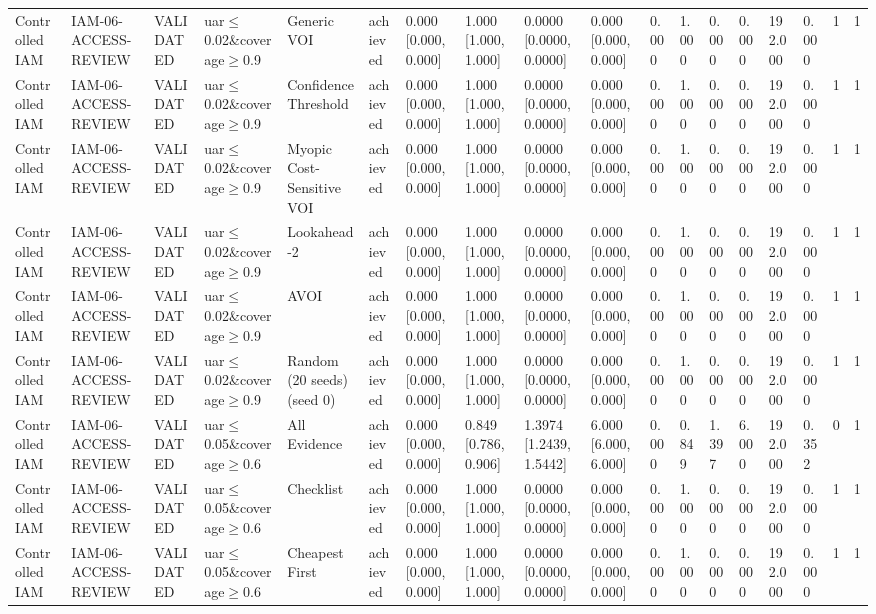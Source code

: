 \begin{table}[!ht]
{\begin{tabular}{llllllllllllllllll}
Controlled IAM & IAM-06-ACCESS-REVIEW & VALIDATED & uar$\le$0.02\&coverage$\ge$0.9 & Generic VOI & achieved & 0.000 [0.000, 0.000] & 1.000 [1.000, 1.000] & 0.0000 [0.0000, 0.0000] & 0.000 [0.000, 0.000] & 0.000 & 1.000 & 0.000 & 0.000 & 192.000 & 0.000 & 1 & 1 \\
Controlled IAM & IAM-06-ACCESS-REVIEW & VALIDATED & uar$\le$0.02\&coverage$\ge$0.9 & Confidence Threshold & achieved & 0.000 [0.000, 0.000] & 1.000 [1.000, 1.000] & 0.0000 [0.0000, 0.0000] & 0.000 [0.000, 0.000] & 0.000 & 1.000 & 0.000 & 0.000 & 192.000 & 0.000 & 1 & 1 \\
Controlled IAM & IAM-06-ACCESS-REVIEW & VALIDATED & uar$\le$0.02\&coverage$\ge$0.9 & Myopic Cost-Sensitive VOI & achieved & 0.000 [0.000, 0.000] & 1.000 [1.000, 1.000] & 0.0000 [0.0000, 0.0000] & 0.000 [0.000, 0.000] & 0.000 & 1.000 & 0.000 & 0.000 & 192.000 & 0.000 & 1 & 1 \\
Controlled IAM & IAM-06-ACCESS-REVIEW & VALIDATED & uar$\le$0.02\&coverage$\ge$0.9 & Lookahead-2 & achieved & 0.000 [0.000, 0.000] & 1.000 [1.000, 1.000] & 0.0000 [0.0000, 0.0000] & 0.000 [0.000, 0.000] & 0.000 & 1.000 & 0.000 & 0.000 & 192.000 & 0.000 & 1 & 1 \\
Controlled IAM & IAM-06-ACCESS-REVIEW & VALIDATED & uar$\le$0.02\&coverage$\ge$0.9 & AVOI & achieved & 0.000 [0.000, 0.000] & 1.000 [1.000, 1.000] & 0.0000 [0.0000, 0.0000] & 0.000 [0.000, 0.000] & 0.000 & 1.000 & 0.000 & 0.000 & 192.000 & 0.000 & 1 & 1 \\
Controlled IAM & IAM-06-ACCESS-REVIEW & VALIDATED & uar$\le$0.02\&coverage$\ge$0.9 & Random (20 seeds) (seed 0) & achieved & 0.000 [0.000, 0.000] & 1.000 [1.000, 1.000] & 0.0000 [0.0000, 0.0000] & 0.000 [0.000, 0.000] & 0.000 & 1.000 & 0.000 & 0.000 & 192.000 & 0.000 & 1 & 1 \\
Controlled IAM & IAM-06-ACCESS-REVIEW & VALIDATED & uar$\le$0.05\&coverage$\ge$0.6 & All Evidence & achieved & 0.000 [0.000, 0.000] & 0.849 [0.786, 0.906] & 1.3974 [1.2439, 1.5442] & 6.000 [6.000, 6.000] & 0.000 & 0.849 & 1.397 & 6.000 & 192.000 & 0.352 & 0 & 1 \\
Controlled IAM & IAM-06-ACCESS-REVIEW & VALIDATED & uar$\le$0.05\&coverage$\ge$0.6 & Checklist & achieved & 0.000 [0.000, 0.000] & 1.000 [1.000, 1.000] & 0.0000 [0.0000, 0.0000] & 0.000 [0.000, 0.000] & 0.000 & 1.000 & 0.000 & 0.000 & 192.000 & 0.000 & 1 & 1 \\
Controlled IAM & IAM-06-ACCESS-REVIEW & VALIDATED & uar$\le$0.05\&coverage$\ge$0.6 & Cheapest First & achieved & 0.000 [0.000, 0.000] & 1.000 [1.000, 1.000] & 0.0000 [0.0000, 0.0000] & 0.000 [0.000, 0.000] & 0.000 & 1.000 & 0.000 & 0.000 & 192.000 & 0.000 & 1 & 1 \\

\end{tabular}}
\end{table}
